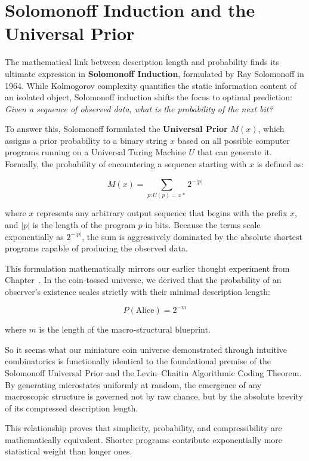 \section{Solomonoff Induction and the Universal Prior}

The mathematical link between description length and probability finds its ultimate expression in \textbf{Solomonoff Induction}, formulated by Ray Solomonoff in 1964.
While Kolmogorov complexity quantifies the static information content of an isolated object,
Solomonoff induction shifts the focus to optimal prediction: \emph{Given a sequence of observed data, what is the probability of the next bit?}

To answer this, Solomonoff formulated the \textbf{Universal Prior} $M(x)$, which assigns a prior probability to a binary string $x$ based on all 
possible computer programs running on a Universal Turing Machine $U$ that can generate it. Formally, the probability of encountering a sequence starting with $x$ is defined as:

\[
M(x) = \sum_{p: U(p) = x*} 2^{-|p|}
\]

where $x$ represents any arbitrary output sequence that begins with the prefix $x$, and $|p|$ is the length of the program $p$ in bits. 
Because the terms scale exponentially as $2^{-|p|}$, the sum is aggressively dominated by the absolute shortest programs capable of producing the observed data. 

This formulation mathematically mirrors our earlier thought experiment from Chapter~.
In the coin-tossed universe, we derived that the probability of an observer's existence scales strictly with their minimal description length:

\[
P(\text{Alice}) = 2^{-m}
\]

where $m$ is the length of the macro-structural blueprint. 

So it seems what our miniature coin universe demonstrated through intuitive combinatorics is functionally identical to the foundational premise of the Solomonoff Universal Prior 
and the Levin--Chaitin Algorithmic Coding Theorem.
By generating microstates uniformly at random, the emergence of any macroscopic structure is governed not by raw chance, but by the absolute brevity of its compressed description length.

This relationship proves that simplicity, probability, and compressibility are mathematically equivalent.
Shorter programs contribute exponentially more statistical weight than longer ones. 

